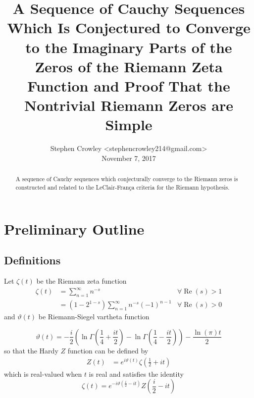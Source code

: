 \documentclass{article}
\newcommand{\tmaffiliation}[1]{\\ #1}
\newcommand{\tmop}[1]{\ensuremath{\operatorname{#1}}}
\begin{document}
\title{A Sequence of Cauchy Sequences Which Is Conjectured to Converge to the
Imaginary Parts of the Zeros of the Riemann Zeta Function and Proof That the
Nontrivial Riemann Zeros are Simple}

\author{
  Stephen Crowley <stephencrowley214@gmail.com>
  \tmaffiliation{November 7, 2017}
}

\maketitle

\begin{abstract}
  A sequence of Cauchy sequences which conjecturally converge to the Riemann
  zeros is constructed and related to the LeClair-Fran{\c c}a criteria for the
  Riemann hypothesis. 
\end{abstract}

\section{Preliminary Outline}

\subsection{Definitions}

Let $\zeta (t)$ be the Riemann zeta function
\begin{equation}
  \begin{array}{lll}
    \zeta (t) & = \sum_{n = 1}^{\infty} n^{- s} & \forall \tmop{Re} (s) > 1\\
    & = (1 - 2^{1 - s}) \sum_{n = 1}^{\infty} n^{- s} (- 1)^{n - 1} & \forall
    \tmop{Re} (s) > 0
  \end{array}
\end{equation}
and $\vartheta (t)$ be Riemann-Siegel vartheta function


\begin{equation}
  \vartheta (t) = - \frac{i}{2} \left( \ln \Gamma \left( \frac{1}{4} + \frac{i
  t}{2} \right) - \ln \Gamma \left( \frac{1}{4} - \frac{i t}{2} \right)
  \right) - \frac{\ln (\pi) t}{2} \label{vartheta}
\end{equation}
so that the Hardy $Z$ function{\cite{HardyZ}} can be defined by
\begin{equation}
  \begin{array}{ll}
    Z (t) & = e^{i \vartheta (t)} \zeta \left( \frac{1}{2} + i t \right)
  \end{array} \label{Z}
\end{equation}
which is real-valued when $t$ is real and satisfies the identity
\begin{equation}
  \zeta (t) = e^{- i \vartheta \left( \frac{i}{2} - i t \right)} Z \left(
  \frac{i}{2} - i t \right) \label{Zz}
\end{equation}
\end{document}
